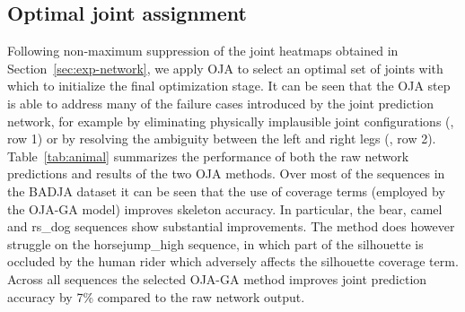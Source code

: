 \subsection{Optimal joint assignment}
Following non-maximum suppression of the joint heatmaps obtained in Section~\ref{sec:exp-network}, we apply OJA to select an optimal set of joints with which to initialize the final optimization stage. It can be seen that the OJA step is able to address many of the failure cases introduced by the joint prediction network, for example by eliminating physically implausible joint configurations (, row 1) or by resolving the ambiguity between the left and right legs (, row 2).  Table~\ref{tab:animal} summarizes the performance of both the raw network predictions and results of the two OJA methods. Over most of the sequences in the BADJA dataset it can be seen that the use of coverage terms (employed by the OJA-GA model) improves skeleton accuracy. In particular, the bear, camel and rs\_dog sequences show substantial improvements. The method does however struggle on the horsejump\_high sequence, in which part of the silhouette is occluded by the human rider which adversely affects the silhouette coverage term. Across all sequences the selected OJA-GA method improves joint prediction accuracy by 7\% compared to the raw network output. 

